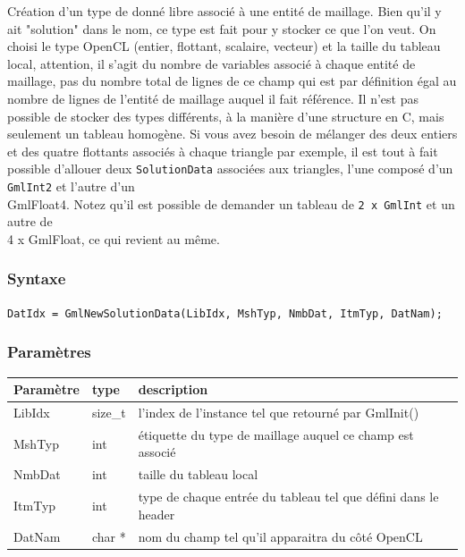 \documentclass[a4paper,12pt]{article}
\begin{document}
Création d'un type de donné libre associé à une entité de maillage.
Bien qu'il y ait "solution" dans le nom, ce type est fait pour y stocker ce que l'on veut.
On choisi le type OpenCL (entier, flottant, scalaire, vecteur) et la taille du tableau local, attention, il s'agit du nombre de variables associé à chaque entité de maillage, pas du nombre total de lignes de ce champ qui est par définition égal au nombre de lignes de l'entité de maillage auquel il fait référence.
Il n'est pas possible de stocker des types différents, à la manière d'une structure en C, mais seulement un tableau homogène. Si vous avez besoin de mélanger des deux entiers et des quatre flottants associés à chaque triangle par exemple, il est tout à fait possible d'allouer deux {\tt SolutionData} associées aux triangles, l'une composé d'un {\tt GmlInt2} et l'autre d'un {\\ GmlFloat4}. Notez qu'il est possible de demander un tableau de {\tt 2 x GmlInt} et un autre de {\\ 4 x GmlFloat}, ce qui revient au même.

\subsubsection*{Syntaxe}

{\tt DatIdx = GmlNewSolutionData(LibIdx, MshTyp, NmbDat, ItmTyp, DatNam);}

\subsubsection*{Paramètres}

\begin{tabular}{|m{2cm}|m{1.5cm}|m{10.5cm}|}
\hline
Paramètre  & type    & description \\
\hline
LibIdx     & size\_t & l'index de l'instance tel que retourné par GmlInit() \\
\hline
MshTyp     & int     & étiquette du type de maillage auquel ce champ est associé \\
\hline
NmbDat     & int     & taille du tableau local \\
\hline
ItmTyp     & int     & type de chaque entrée du tableau tel que défini dans le header \\
\hline
DatNam     & char *  & nom du champ tel qu'il apparaitra du côté OpenCL \\
\hline
\end{tabular}

\medskip
\end{document}
